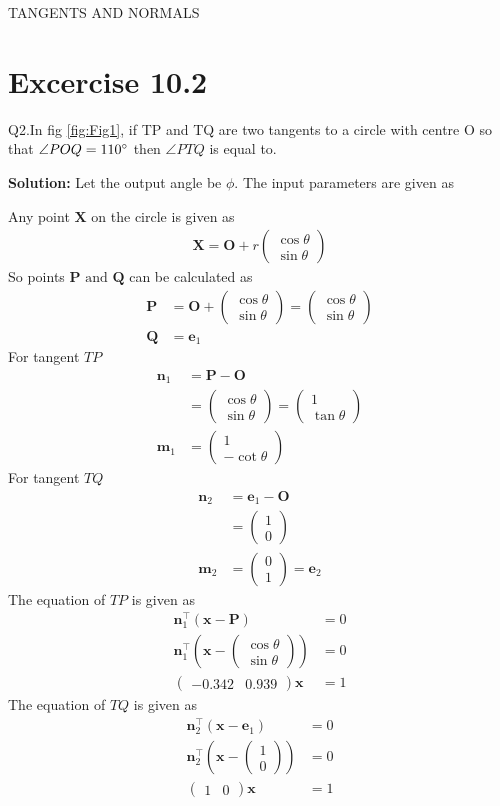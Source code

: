 \documentclass[12pt]{article}
\providecommand{\brak}[1]{\ensuremath{\left(#1\right)}}
\newcommand{\solution}{\noindent \textbf{Solution: }}
\newcommand{\myvec}[1]{\ensuremath{\begin{pmatrix}#1\end{pmatrix}}}
\let\vec\mathbf
\begin{document}
\begin{center}
\textbf\large{TANGENTS AND NORMALS}

\end{center}
\section*{Excercise 10.2}
Q2.In fig \ref{fig:Fig1}, if TP and TQ are two tangents to a circle with centre O so that $\angle{POQ} = 110\degree$ then $\angle{PTQ}$ is equal to.

\solution
Let the output angle be $\phi$.
The input parameters are given as

Any point $\vec{X}$ on the circle is given as
\begin{align}
	\vec{X} = \vec{O}+r\myvec{\cos\theta\\\sin\theta}
\end{align}
So points $\vec{P} \text{ and } \vec{Q}$ can be calculated as
\begin{align}
	\vec{P} &= \vec{O}+\myvec{\cos\theta\\\sin\theta} = \myvec{\cos\theta\\\sin\theta}\\
	\vec{Q} &= \vec{e}_1
\end{align}
For tangent $TP$
\begin{align}
	\vec{n}_1 &= \vec{P}-\vec{O}\\
	&= \myvec{\cos\theta\\\sin\theta} =  \myvec{1\\\tan\theta}\\
	\vec{m}_1 &= \myvec{1\\-\cot\theta}
\end{align}
For tangent $TQ$
\begin{align}
	\vec{n}_2 &= \vec{e}_1-\vec{O}\\
	&= \myvec{1\\0}\\
	\vec{m}_2 &= \myvec{0\\1}=\vec{e}_2
\end{align}
The equation of $TP$ is given as
\begin{align}
	\vec{n}_1^\top\brak{\vec{x}-\vec{P}} &= 0\\
	\vec{n}_1^\top\brak{\vec{x}-\myvec{\cos\theta\\\sin\theta}} &= 0\\
	\label{eq:eq1}
	\myvec{-0.342 & 0.939}\vec{x} &= 1
\end{align}
The equation of $TQ$ is given as
\begin{align}
	\vec{n}_2^\top\brak{\vec{x}-\vec{e}_1} &= 0\\
	\vec{n}_2^\top\brak{\vec{x}-\myvec{1\\0}} &= 0\\
	\label{eq:eq2}
	\myvec{1&0}\vec{x} &= 1
\end{align}
\end{document}

